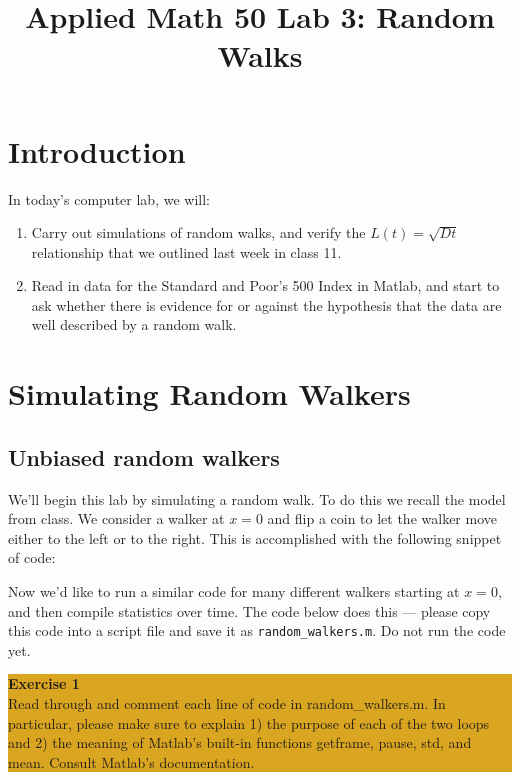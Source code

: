 \documentclass[12pt]{amsart}
\title{Applied Math 50 Lab 3: Random Walks
}
\date{}
\begin{document}
\maketitle

\section{Introduction}
In today's computer lab, we will:
\begin{enumerate}
	\item Carry out simulations of random walks, and verify the $L(t) = \sqrt{D t}$ relationship that we outlined last week in class 11.
	\item Read in data for the Standard and Poor's 500 Index in Matlab, and start to ask whether there is evidence for or against the hypothesis that the data are well described by a random walk.
\end{enumerate}

\section{Simulating Random Walkers}
\subsection{Unbiased random walkers}

\noindent We'll begin this lab by simulating a random walk.  To do this we recall the model from class.  We consider a walker at $x =0$ and flip a coin to let the walker move either to the left or to the right.  This is accomplished with the following snippet of code:



\noindent Now we'd like to run a similar code for many different walkers starting at $x = 0$, and then compile statistics over time.  The code below does this --- please copy this code into a script file and save it as 
\verb+random_walkers.m+.  Do not run the code yet.

\bigskip
\begin{center}
\colorbox{Goldenrod}{\parbox{15cm}{
{
\textbf{\large Exercise 1}\vspace{1mm} \\
Read through and comment each line of code in random\_walkers.m.  In particular, please make sure to explain 1) the purpose of each of the two loops and 2) the meaning of Matlab's built-in functions getframe, pause, std, and mean.  Consult Matlab's documentation.
 }}}
\end{center}
\bigskip
\end{document}

